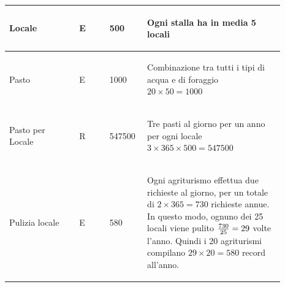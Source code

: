 \documentclass[12pt,a4paper]{article}
\begin{document}
\begin{center}
\begin{longtable}{|p{0.23\linewidth}|p{0.1\linewidth}|p{0.11\linewidth}|p{0.45\linewidth}|}
\hline
Locale 				& \begin{center}
\vspace{-25pt}E
\end{center}
					& \begin{center}
					\vspace{-25pt}500\end{center}
					& \begin{flushleft}\vspace{-25pt} Ogni stalla ha in media 5 locali \end{flushleft}\\ 

\hline
Pasto 				& \begin{center}
\vspace{-25pt}E
\end{center}
					& \begin{center}
					\vspace{-25pt}1000\end{center}
					& \begin{flushleft}\vspace{-25pt} Combinazione tra tutti i tipi di acqua e di foraggio $20\times 50= 1000$ \end{flushleft}\\ 

\hline
Pasto per Locale 				& \begin{center}
\vspace{-25pt}R
\end{center}
					& \begin{center}
					\vspace{-25pt}547500\end{center}
					& \begin{flushleft}\vspace{-25pt} Tre pasti al giorno per un anno per ogni locale $3\times365\times500=547500$ \end{flushleft}\\ 

\hline
Pulizia locale 				& \begin{center}
\vspace{-25pt}E
\end{center}
					& \begin{center}
					\vspace{-25pt}580\end{center}
					& \begin{flushleft}\vspace{-25pt} Ogni agriturismo effettua due richieste al giorno, per un totale di $2\times 365=730$ richieste annue. In questo modo, ognuno dei 25 locali viene pulito ${730\over 25}=29$ volte l'anno. Quindi i 20 agriturismi compilano $29\times 20=580$ record all'anno. \end{flushleft}\\ 


\end{longtable}
\end{center}
\end{document}
